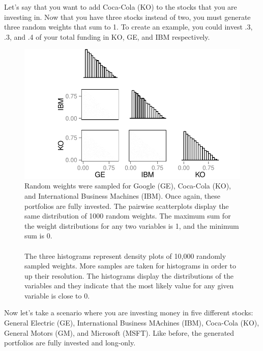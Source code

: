 \documentclass{article}\usepackage{graphicx, color}
\makeatletter
\def\maxwidth{ %
  \ifdim\Gin@nat@width>\linewidth
    \linewidth
  \else
    \Gin@nat@width
  \fi
}
\newenvironment{knitrout}{}{} %
\makeatother
\begin{document}
Let's say that you want to add Coca-Cola (KO) to the stocks that you are investing in. Now that you have three stocks instead of two, you must generate three random weights that sum to 1. To create an example, you could invest .3, .3, and .4 of your total funding in KO, GE, and IBM respectively. 
  
\begin{figure}[H]
\begin{knitrout}
\color{fgcolor}
\includegraphics[width=\maxwidth]{figure/figChunk1} 

\end{knitrout}

\caption{Random weights were sampled for Google (GE), Coca-Cola (KO), and International Business Machines (IBM). Once again, these portfolios are fully invested. The pairwise scatterplots display the same distribution of 1000 random weights. The maximum sum for the weight distributions for any two variables is 1, and the minimum sum is 0.
\\
\\
The three histograms represent density plots of 10,000 randomly sampled weights. More samples are taken for histograms in order to up their resolution. The histograms display the distributions of the variables and they indicate that the most likely value for any given variable is close to 0.}

\end{figure}

Now let's take a scenario where you are investing money in five different stocks: General Electric (GE), International Business MAchines (IBM), Coca-Cola (KO), General Motors (GM), and Microsoft (MSFT). Like before, the generated portfolios are fully invested and long-only.
\end{document}

